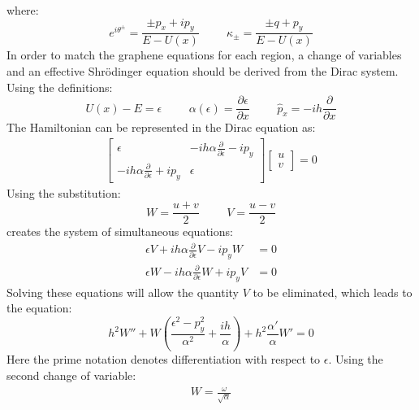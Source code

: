 		where:
		\begin{equation}
			e^{i\theta^{\pm}}=\frac{\pm p_{x}+ip_{y}}{E-U\left(x\right)}
			\hspace{1cm}
			\kappa_{\pm}=\frac{\pm q+p_{y}}{E-U\left(x\right)}
		\end{equation}
		In order to match the graphene equations for each region, a change of variables and an effective Shr{\" o}dinger equation should be derived from the Dirac system. Using the definitions:
		\begin{equation}
			U\left(x\right)-E=\epsilon\hspace{1cm}\alpha\left(\epsilon\right)=\frac{\partial\epsilon}{\partial x}\hspace{1cm}\hat{p}_{x}=-ih\frac{\partial}{\partial x}
		\end{equation}
		The Hamiltonian can be represented in the Dirac equation as:
		\begin{align}
			\left[\begin{array}{cc}
				\epsilon&-ih\alpha\frac{\partial}{\partial\epsilon}-ip_{y}\\
				-ih\alpha\frac{\partial}{\partial\epsilon}+ip_{y}&\epsilon
			\end{array}\right]
			\left[\begin{array}{cc}
				u\\
				v
			\end{array}\right]=0
		\end{align}
		Using the substitution:
		\begin{equation}
			W=\frac{u+v}{2}
			\hspace{1cm}
			V=\frac{u-v}{2}
		\end{equation}
		creates the system of simultaneous equations:
		\begin{align}
			\epsilon V+ih\alpha\frac{\partial}{\partial\epsilon}V-ip_{y}W&=0\\
			\epsilon W-ih\alpha\frac{\partial}{\partial\epsilon}W+ip_{y}V&=0
		\end{align}
		Solving these equations will allow the quantity $V$ to be eliminated, which leads to the equation:
		\begin{equation}
			h^{2}W''+W\left(\frac{\epsilon^{2}-p_{y}^{2}}{\alpha^{2}}+\frac{ih}{\alpha}\right)+h^{2}\frac{\alpha'}{\alpha}W'=0
			\label{WKB-W}
		\end{equation}
		Here the prime notation denotes differentiation with respect to $\epsilon$. Using the second change of variable:
		\begin{gather}
			W=\frac{\omega}{\sqrt{\alpha}}
		\end{gather}
